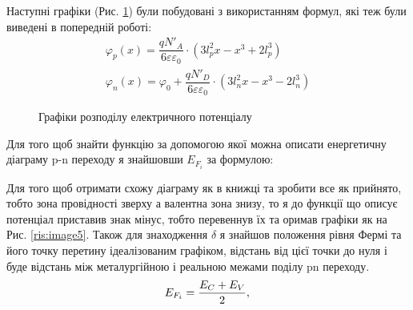 \documentclass[14pt,a4paper]{scrartcl}
\begin{document}
\newpage
Наступні графіки (Рис. \ref{ris:image2}) були побудовані з використанням формул, які теж були виведені в попередній роботі:
\begin{align}
\varphi_p(x)=\dfrac{qN'_A}{6\varepsilon\varepsilon_0} \cdot (3l_p^2x-x^3+2l_p^3)\\
\varphi_n(x)= \varphi_0+\dfrac{qN'_D}{6\varepsilon\varepsilon_0}\cdot (3l_n^2x-x^3-2l_n^3)
\end{align}

\begin{center}
\begin{figure}[h]
\caption{Графіки розподілу електричного потенціалу}
\label{ris:image2}
\end{figure}
\end{center}

\newpage
\clearpage
Для того щоб знайти функцію за допомогою якої можна описати енергетичну діаграму p-n переходу я знайшовши $E_{F_{i}}$ за формулою:

Для того щоб отримати схожу діаграму як в книжці та зробити все як прийнято, тобто зона провідності зверху а валентна зона знизу, то я до функції що описує потенціал приставив знак мінус, тобто перевеннув їх та оримав графіки як на Рис. \ref{ris:image5}. Також для знаходження $\delta$ я знайшов положення рівня Фермі та його точку перетину ідеалізованим графіком, відстань від цієї точки до нуля і буде відстань між металургійною і реальною межами поділу pn переходу. 
\begin{equation}
E_{F_{i}} = \dfrac{E_{C} + E_V}{2},\\
\end{equation}
\end{document}
